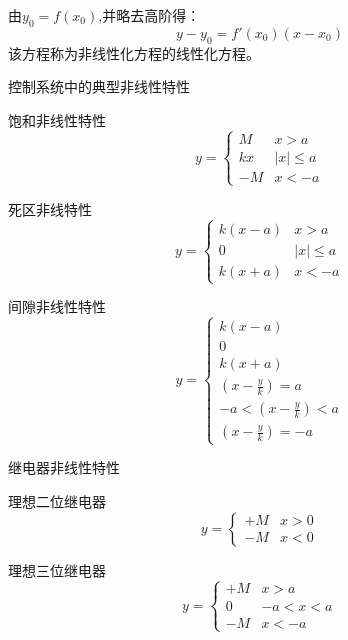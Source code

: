 \begin{frame}
\begin{block}{}
由$y_0=f(x_0)$,并略去高阶得：
\[y-y_0=f'(x_0)(x-x_0)\]
该方程称为非线性化方程的线性化方程。
\end{block}
\end{frame}

\begin{frame}{控制系统中的典型非线性特性}
\begin{block}{饱和非线性特性}
\begin{equation*}
y=\begin{cases}
M & x>a\\
kx & |x|\leq a\\
-M & x<-a
\end{cases}
\end{equation*}
\end{block}
\begin{block}{死区非线特性}
\begin{equation*}
y=\begin{cases}
k(x-a) & x>a\\
0 & |x|\leq a\\
k(x+a) & x<-a
\end{cases}
\end{equation*}
\end{block}
\end{frame}

\begin{frame}
\begin{block}{间隙非线性特性}
\begin{equation*}
y=\begin{cases}
k(x-a) \\
0 \\
k(x+a) \\
(x-\frac{y}{k})=a \\
-a<(x-\frac{y}{k} )<a\\
(x-\frac{y}{k})=-a
\end{cases}
\end{equation*}
\end{block}
\end{frame}

\begin{frame}{继电器非线性特性}
\begin{block}{理想二位继电器}
\begin{equation*}
y=\begin{cases}
+M & x>0\\
-M & x<0
\end{cases}
\end{equation*}
\end{block}
\begin{block}{理想三位继电器}
\begin{equation*}
y=\begin{cases}
+M & x>a\\
0 & -a<x< a\\
-M & x<-a
\end{cases}
\end{equation*}
\end{block}
\end{frame}

